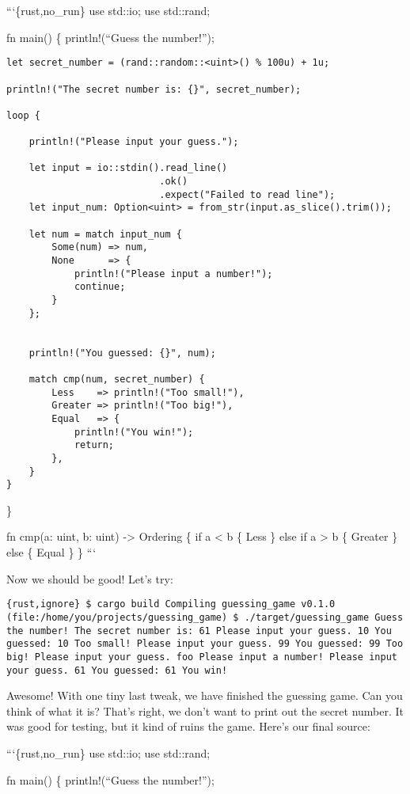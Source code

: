 \documentclass[]{article}
\begin{document}
```\{rust,no\_run\} use std::io; use std::rand;

fn main() \{ println!(``Guess the number!'');

\begin{verbatim}
let secret_number = (rand::random::<uint>() % 100u) + 1u;

println!("The secret number is: {}", secret_number);

loop {

    println!("Please input your guess.");

    let input = io::stdin().read_line()
                           .ok()
                           .expect("Failed to read line");
    let input_num: Option<uint> = from_str(input.as_slice().trim());

    let num = match input_num {
        Some(num) => num,
        None      => {
            println!("Please input a number!");
            continue;
        }
    };


    println!("You guessed: {}", num);

    match cmp(num, secret_number) {
        Less    => println!("Too small!"),
        Greater => println!("Too big!"),
        Equal   => {
            println!("You win!");
            return;
        },
    }
}
\end{verbatim}

\}

fn cmp(a: uint, b: uint) -\textgreater{} Ordering \{ if a \textless{} b
\{ Less \} else if a \textgreater{} b \{ Greater \} else \{ Equal \} \}
```

Now we should be good! Let's try:

\texttt{\{rust,ignore\} \$ cargo build    Compiling guessing\_game v0.1.0 (file:/home/you/projects/guessing\_game) \$ ./target/guessing\_game  Guess the number! The secret number is: 61 Please input your guess. 10 You guessed: 10 Too small! Please input your guess. 99 You guessed: 99 Too big! Please input your guess. foo Please input a number! Please input your guess. 61 You guessed: 61 You win!}

Awesome! With one tiny last tweak, we have finished the guessing game.
Can you think of what it is? That's right, we don't want to print out
the secret number. It was good for testing, but it kind of ruins the
game. Here's our final source:

```\{rust,no\_run\} use std::io; use std::rand;

fn main() \{ println!(``Guess the number!'');
\end{document}
